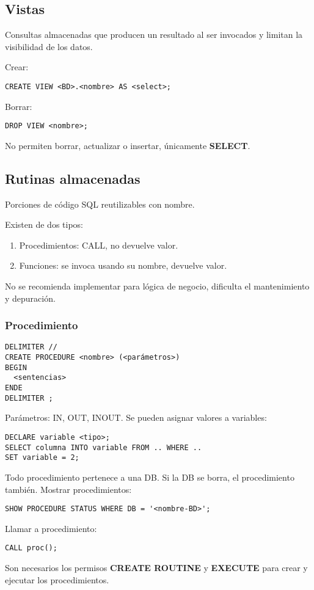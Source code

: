 \documentclass{article}
\begin{document}
\subsection{Vistas}
\begin{theorem}
Consultas almacenadas que producen un resultado al ser invocados y limitan la visibilidad de los datos.
\end{theorem}
Crear:
\begin{verbatim}
CREATE VIEW <BD>.<nombre> AS <select>;
\end{verbatim}
Borrar:
\begin{verbatim}
DROP VIEW <nombre>;
\end{verbatim}
No permiten borrar, actualizar o insertar, únicamente \textbf{SELECT}.

\subsection{Rutinas almacenadas}
\begin{theorem}
Porciones de código SQL reutilizables con nombre.
\end{theorem}
Existen de dos tipos: 
\begin{enumerate}
	\item Procedimientos: CALL, no devuelve valor.
	\item Funciones: se invoca usando su nombre, devuelve valor.
\end{enumerate}
No se recomienda implementar para lógica de negocio, dificulta el mantenimiento y depuración.
\subsubsection{Procedimiento}
\begin{verbatim}
DELIMITER //
CREATE PROCEDURE <nombre> (<parámetros>)
BEGIN
  <sentencias>
ENDE
DELIMITER ;
\end{verbatim}
Parámetros: IN, OUT, INOUT.
Se pueden asignar valores a variables:
\begin{verbatim}
DECLARE variable <tipo>;
SELECT columna INTO variable FROM .. WHERE ..
SET variable = 2;
\end{verbatim}
Todo procedimiento pertenece a una DB. Si la DB se borra, el procedimiento también. 
Mostrar procedimientos:
\begin{verbatim}
SHOW PROCEDURE STATUS WHERE DB = '<nombre-BD>';
\end{verbatim}
Llamar a procedimiento:
\begin{verbatim}
CALL proc();
\end{verbatim}
Son necesarios los permisos \textbf{CREATE ROUTINE} y \textbf{EXECUTE} para crear y ejecutar los procedimientos. 
\end{document}
